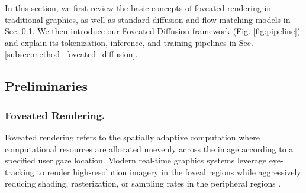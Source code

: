 


In this section, we first review the basic concepts of foveated rendering in traditional graphics, as well as standard diffusion and flow-matching models in Sec. \ref{subsec:method_preliminaries}. We then introduce our Foveated Diffusion framework (Fig. \ref{fig:pipeline}) and explain its tokenization, inference, and training pipelines in Sec. \ref{subsec:method_foveated_diffusion}.

\subsection{Preliminaries}
\label{subsec:method_preliminaries}

\subsubsection{Foveated Rendering.}\label{subsubsec:fovrend}
Foveated rendering refers to the spatially adaptive computation where computational resources are allocated unevenly across the image according to a specified user gaze location. Modern real-time graphics systems leverage eye-tracking to render high-resolution imagery in the foveal regions while aggressively reducing shading, rasterization, or sampling rates in the peripheral regions \cite{bandera1989foveal, geisler1998foveated, guenter2012foveated3d, weier2016foveated, patney2016gazeVR, kaplanyan2019deepfovea}.


